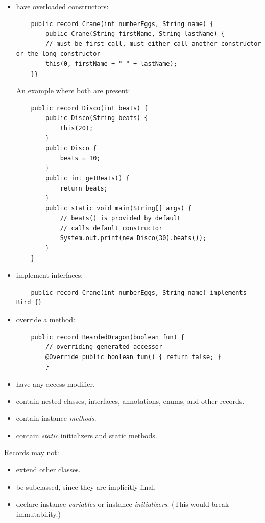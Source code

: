 \documentclass{scrartcl}
\begin{document}
    \begin{itemize}
    \item have overloaded constructors:
    \begin{lstlisting}
    public record Crane(int numberEggs, String name) {
        public Crane(String firstName, String lastName) {
        // must be first call, must either call another constructor or the long constructor
        this(0, firstName + " " + lastName);
    }}
    \end{lstlisting}

    An example where both are present:

    \begin{lstlisting}
    public record Disco(int beats) {
        public Disco(String beats) {
            this(20);
        }
        public Disco {
            beats = 10;
        }
        public int getBeats() {
            return beats;
        }
        public static void main(String[] args) {
            // beats() is provided by default
            // calls default constructor
            System.out.print(new Disco(30).beats());
        }
    }
    \end{lstlisting}
    \item implement interfaces:
    \begin{lstlisting}
    public record Crane(int numberEggs, String name) implements Bird {}
    \end{lstlisting}
    \item override a method:
    \begin{lstlisting}
    public record BeardedDragon(boolean fun) {
        // overriding generated accessor
        @Override public boolean fun() { return false; }
        }
    \end{lstlisting}
    \item have any access modifier.
    \item contain nested classes, interfaces, annotations, enums, and other records.
    \item contain instance \textit{methods}.
    \item contain \textit{static} initializers and static methods.
    \end{itemize}

    Records may not:

    \begin{itemize}
        \item extend other classes.
        \item be subclassed, since they are implicitly final.
        \item  declare instance \textit{variables} or instance \textit{initializers}. (This would break immutability.)
    \end{itemize}
\end{document}
